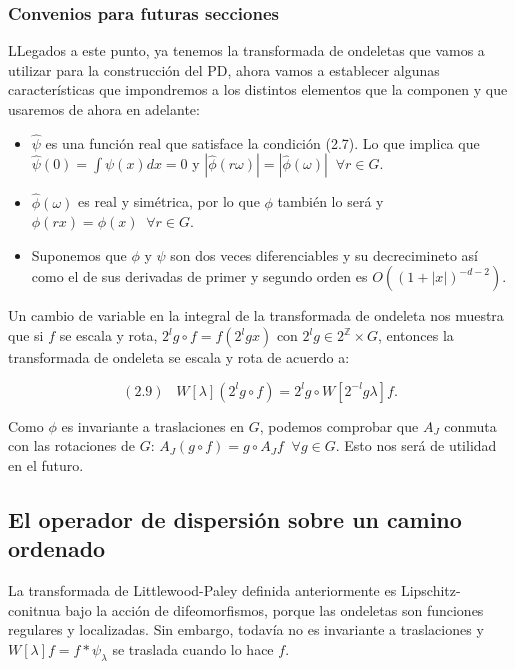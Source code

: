 \medskip


\subsubsection{Convenios para futuras secciones}

\noindent LLegados a este punto, ya tenemos la transformada de ondeletas que vamos a utilizar para la construcción del PD, ahora vamos a establecer algunas características que impondremos a los distintos elementos que la componen y que usaremos de ahora en adelante: 

\begin{itemize}
    \item $\widehat{\psi}$ es una función real que satisface la condición (2.7). Lo que implica que $\widehat{\psi}(0)=\int \psi(x)dx=0$ y $|\widehat{\phi}(r\omega)|=|\widehat{\phi}(\omega)| \;\; \forall r\in G$.
    \item $\widehat{\phi}(\omega)$ es real y simétrica, por lo que $\phi$ también lo será y $\phi(rx)=\phi(x) \;\; \forall r \in G$. 
    \item Suponemos que $\phi$ y $\psi$ son dos veces diferenciables y su decrecimineto así como el de sus derivadas de primer y segundo orden es $O((1+|x|)^{-d-2})$.
\end{itemize}

\medskip

\noindent Un cambio de variable en la integral de la transformada de ondeleta nos muestra que si $f$ se escala y rota, $2^lg \circ f=f(2^lgx)$ con $2^lg \in 2^{\mathbb{Z}} \times G$, entonces la transformada de ondeleta se escala y rota de acuerdo a: 

$$(2.9) \;\;\; W[\lambda](2^lg\circ f)=2^lg \circ W[2^{-l}g\lambda]f.$$

\medskip

\noindent Como $\phi$ es invariante a traslaciones en $G$, podemos comprobar que $A_J$ conmuta con las rotaciones de $G$: $A_J(g\circ f)=g\circ A_J f \;\; \forall g \in G$. Esto nos será de utilidad en el futuro.

\subsection{El operador de dispersión sobre un camino ordenado}

\noindent La transformada de Littlewood-Paley definida anteriormente es Lipschitz-conitnua bajo la acción de difeomorfismos, porque las ondeletas son funciones regulares y localizadas. Sin embargo, todavía no es invariante a traslaciones y $W[\lambda]f=f\ast\psi_\lambda$ se traslada cuando lo hace $f$.

